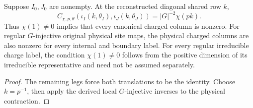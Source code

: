 \begin{lemma}
    \label{thm:peps_regular_two_site_charge_nonzero}
    Suppose $I_0,J_0$ are nonempty. At the reconstructed diagonal shared row $k$,
    \[
        C_{\chi,p,\theta}(\iota_I(k,\theta_I),\iota_J(k,\theta_J))
        =|G|^{-2}\chi(pk).
    \]
    Thus $\chi(1)\ne0$ implies that every canonical charged column is nonzero.
    For regular $G$-injective original physical site maps, the physical
    charged columns are also nonzero for every internal and boundary label.
    For every regular irreducible charge label, the condition
    $\chi(1)\ne0$ follows from the positive dimension of its irreducible
    representative and need not be assumed separately.
    \leanok
\end{lemma}
\begin{proof}
    \leanok
    The remaining legs force both translations to be the identity. Choose
    $k=p^{-1}$, then apply the derived local $G$-injective inverses to the
    physical contraction.
\end{proof}

